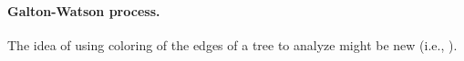 \paragraph*{Galton-Watson process.}
The idea of using coloring of the edges of a tree to analyze \FastCut{}
might be new (i.e., ).


%  


% 
% 
\ChapterEnd{}

